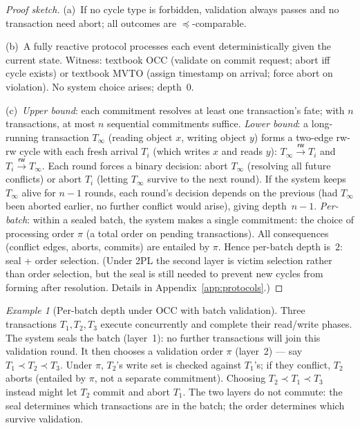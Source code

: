 \documentclass[acmsmall,review,anonymous]{acmart}
\newcommand{\Ord}{\preceq}
\theoremstyle{remark}
\newtheorem{example}{Example}
\numberwithin{definition}{section}
\numberwithin{theorem}{section}
\numberwithin{lemma}{section}
\numberwithin{corollary}{section}
\numberwithin{remark}{section}
\numberwithin{example}{section}
\numberwithin{observation}{section}
\numberwithin{assumption}{section}
\begin{document}
\begin{proof}[Proof sketch]
  (a)~If no cycle type is forbidden, validation always passes and no
  transaction need abort; all outcomes are $\Ord$-comparable.

  (b)~A fully reactive protocol processes each event deterministically
  given the current state.
  Witness: textbook OCC (validate on commit request; abort iff cycle exists) or
  textbook MVTO (assign timestamp on arrival; force abort on violation).
  No system choice arises; depth~$0$.

  (c)~\emph{Upper bound}: each commitment resolves at least one
  transaction's fate; with $n$ transactions, at most $n$ sequential
  commitments suffice.
  \emph{Lower bound}: a long-running transaction $T_\infty$ (reading
  object $x$, writing object $y$) forms a two-edge rw-rw cycle with
  each fresh arrival $T_i$ (which writes $x$ and reads $y$):
  $T_\infty \xrightarrow{\mathsf{rw}} T_i$ and
  $T_i \xrightarrow{\mathsf{rw}} T_\infty$.
  Each round forces a binary decision: abort $T_\infty$ (resolving all
  future conflicts) or abort $T_i$ (letting $T_\infty$ survive to the
  next round).
  If the system keeps $T_\infty$ alive for $n{-}1$ rounds, each
  round's decision depends on the previous (had $T_\infty$ been
  aborted earlier, no further conflict would arise), giving
  depth~$n{-}1$.
  \emph{Per-batch}: within a sealed batch, the system makes a single
  commitment: the choice of processing order $\pi$ (a total order on
  pending transactions).
  All consequences (conflict edges, aborts, commits) are entailed by
  $\pi$.
  Hence per-batch depth is~$2$: seal + order selection.
  (Under 2PL the second layer is victim selection rather than order
  selection, but the seal is still needed to prevent new cycles
  from forming after resolution.  Details in
  Appendix~\ref{app:protocols}.)
\end{proof}


\begin{example}[Per-batch depth under OCC with batch validation]
  \label{ex:overlapping-cycles}
  Three transactions $T_1, T_2, T_3$ execute concurrently and complete
  their read/write phases.
  The system seals the batch (layer~1): no further transactions will
  join this validation round.
  It then chooses a validation order $\pi$ (layer~2) --- say
  $T_1 \prec T_2 \prec T_3$.
  Under $\pi$, $T_2$'s write set is checked against $T_1$'s; if they
  conflict, $T_2$ aborts (entailed by $\pi$, not a separate
  commitment).
  Choosing $T_2 \prec T_1 \prec T_3$ instead might let $T_2$ commit
  and abort $T_1$.
  The two layers do not commute: the seal determines which transactions
  are in the batch; the order determines which survive validation.
\end{example}
\end{document}
